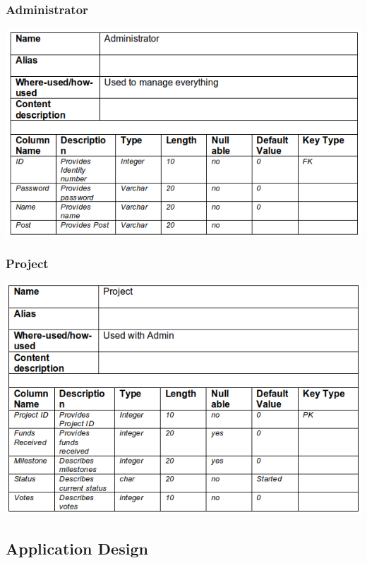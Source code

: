 \documentclass{scrreprt}
\begin{document}
\subsubsection{Administrator}
\includegraphics[width=\textwidth]{admin.png}

\subsubsection{Project}
\includegraphics[width=\textwidth]{project.png}

\subsection{Application Design}
\end{document}
